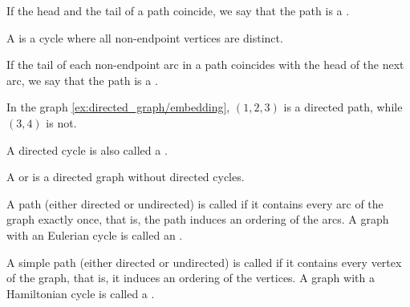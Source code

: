 \begin{definition}
\begin{defenum}
    If the head and the tail of a path coincide, we say that the path is a .

    A  is a cycle where all non-endpoint vertices are distinct.

    \cite[chapter 1, section 3.2]{Gondran1984} If the tail of each non-endpoint arc in a path coincides with the head of the next arc, we say that the path is a .

    In the graph \cref{ex:directed_graph/embedding}, \( (1, 2, 3) \) is a directed path, while \( (3, 4) \) is not.

    A directed cycle is also called a .

    \cite[231]{Erickson2019} A  or  is a directed graph without directed cycles.

    \cite[chapter 8, section 1.1]{Gondran1984} A path (either directed or undirected) is called  if it contains every arc of the graph exactly once, that is, the path induces an ordering of the arcs. A graph with an Eulerian cycle is called an .

    \cite[chapter 8, section 3.1]{Gondran1984} A simple path (either directed or undirected) is called  if it contains every vertex of the graph, that is, it induces an ordering of the vertices. A graph with a Hamiltonian cycle is called a .
  \end{defenum}
\end{definition}

